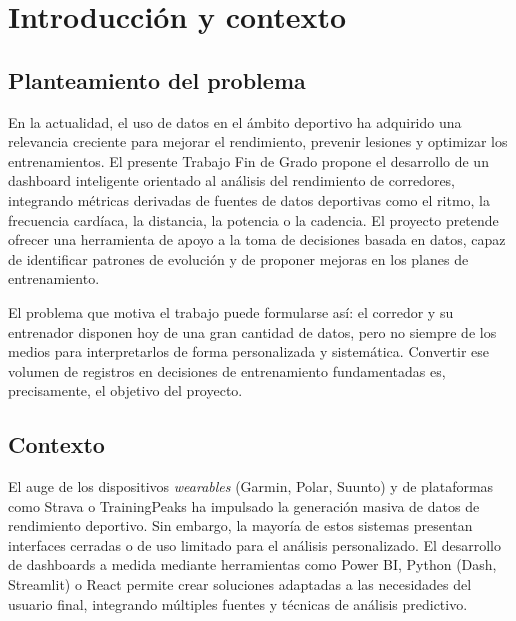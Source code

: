 \chapter{Introducción y contexto}
\label{ch:introduccion}


\section{Planteamiento del problema}
\label{sec:planteamiento}

En la actualidad, el uso de datos en el ámbito deportivo ha adquirido una
relevancia creciente para mejorar el rendimiento, prevenir lesiones y optimizar
los entrenamientos. El presente Trabajo Fin de Grado propone el desarrollo de un
dashboard inteligente orientado al análisis del rendimiento de corredores,
integrando métricas derivadas de fuentes de datos deportivas como el ritmo, la
frecuencia cardíaca, la distancia, la potencia o la cadencia. El proyecto
pretende ofrecer una herramienta de apoyo a la toma de decisiones basada en
datos, capaz de identificar patrones de evolución y de proponer mejoras en los
planes de entrenamiento.

El problema que motiva el trabajo puede formularse así: el corredor y su
entrenador disponen hoy de una gran cantidad de datos, pero no siempre de los
medios para interpretarlos de forma personalizada y sistemática. Convertir ese
volumen de registros en decisiones de entrenamiento fundamentadas es,
precisamente, el objetivo del proyecto.

\section{Contexto}
\label{sec:contexto}

El auge de los dispositivos \emph{wearables} (Garmin, Polar, Suunto) y de
plataformas como Strava o TrainingPeaks ha impulsado la generación masiva de
datos de rendimiento deportivo. Sin embargo, la mayoría de estos sistemas
presentan interfaces cerradas o de uso limitado para el análisis personalizado.
El desarrollo de dashboards a medida mediante herramientas como Power BI, Python
(Dash, Streamlit) o React permite crear soluciones adaptadas a las necesidades
del usuario final, integrando múltiples fuentes y técnicas de análisis
predictivo.

